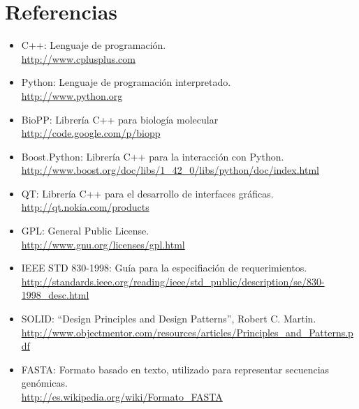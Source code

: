 \section{Referencias}
  \label{appendix-ref}
  \begin{itemize}
    \item C++: Lenguaje de programaci\'on. \\
    \url{http://www.cplusplus.com}
    \item Python: Lenguaje de programaci\'on interpretado.\\ 
    \url{http://www.python.org}
    \item BioPP: Librer\'ia C++ para biolog\'ia molecular\\
    \url{http://code.google.com/p/biopp}
    \item Boost.Python: Librer\'ia C++ para la interacci\'on con Python.\\
    \url{http://www.boost.org/doc/libs/1_42_0/libs/python/doc/index.html}
    \item QT: Librer\'ia C++ para el desarrollo de interfaces gr\'aficas.\\
    \url{http://qt.nokia.com/products}
    \item GPL: General Public License. \\
    \url{http://www.gnu.org/licenses/gpl.html}
    \item IEEE STD 830-1998: Gu\'ia para la especifiaci\'on de requerimientos. \\
    \url{http://standards.ieee.org/reading/ieee/std_public/description/se/830-1998_desc.html}
    \item SOLID: ``Design Principles and Design Patterns'', Robert C. Martin. \\
    \url{http://www.objectmentor.com/resources/articles/Principles_and_Patterns.pdf}    
    \item FASTA: Formato basado en texto, utilizado para representar secuencias gen\'omicas.\\
    \url{http://es.wikipedia.org/wiki/Formato_FASTA}
  \end{itemize}
